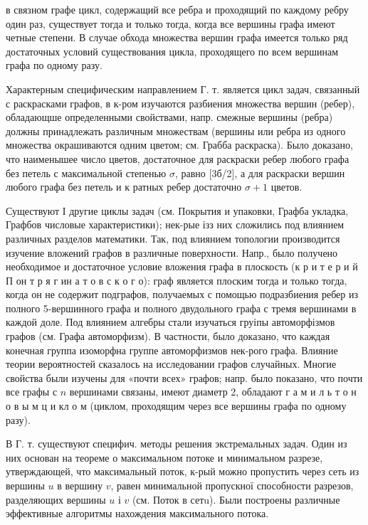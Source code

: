 \documentclass[10pt]{article}
\begin{document}
в связном графе цикл, содержащий все ребра и проходящий по каждому ребру один раз, существует тогда и только тогда, когда все вершины графа имеют четные степени. В случае обхода множества вершин графа имеется только ряд достаточных условий существования цикла, проходящего по всем вершинам графа по одному разу.



Характерным специфическим направлением Г. т. является цикл задач, связанный с раскрасками графов, в к-ром изучаются разбиения множества вершин (ребер), обладающше определенными свойствами, напр. смежные вершины (ребра) должны принадлежать различным множествам (вершины или ребра из одного множества окрашиваются одним цветом; см. Грабба раскраска). Было доказано, что наименышее число цветов, достаточное для раскраски ребер любого графа без петель с максимальной степенью $\sigma$, равно [3б/2], а для раскраски вершин любого графа без петель и к ратных ребер достаточно $\sigma+1$ цветов.



Существуют І другие циклы задач (см. Покрытия и упаковки, Графба укладка, Графбов числовые характеристики); нек-рые ізз них сложились под влиянием различных разделов математики. Так, под влиянием топологии производится изучение вложений графов в различные поверхности. Напр., было получено необходимое и достаточное условие вложения графа в плоскость (к р и т е р и й П он т р я г ин а т о в с к о г о): граф является плоским тогда и только тогда, когда он не содержит подграфов, получаемых с помощью подразбиения ребер из полного 5-вершинного графа и полного двудольного графа с тремя вершинами в каждой доле. Под влиянием алгебры стали изучаться груіпы автоморфізмов графов (см. Графа автоморфизм). В частности, было доказано, что каждая конечная группа изоморфна группе автоморфизмов нек-рого графа. Влияние теории вероятностей сказалось на исследовании графов случайных. Многие свойства были изучены для «почти всех» графов; напр. было показано, что почти все графы с $n$ вершинами связаны, имеют диаметр 2, обладают г а м и л ь т о н о в ы м ц и кл о м (циклом, проходящим через все вершины графа по одному разу).



В Г. т. существуют специфич. методы решения экстремальных задач. Один из них основан на теореме о максимальном потоке и минимальном разрезе, утверждающей, что максимальный поток, к-рый можно пропустить через сеть из вершины $u$ в вершину $v$, равен минимальной пропускної способности разрезов, разделяющих вершины $u$ і $v$ (см. Поток в сетu). Были построены различные эффективные алгоритмы нахождения максимального потока.
\end{document}
